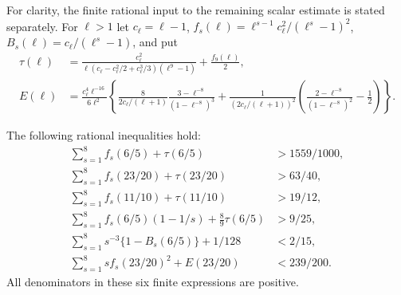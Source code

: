 For clarity, the finite rational input to the remaining scalar estimate
is stated separately.  For $\ell>1$ let $c_\ell=\ell-1$,
$f_s(\ell)=\ell^{s-1}c_\ell^2/(\ell^s-1)^2$,
$B_s(\ell)=c_\ell/(\ell^s-1)$, and put
\begin{align*}
 \tau(\ell)&=\frac{c_\ell^2}
 {\ell(c_\ell-c_\ell^2/2+c_\ell^3/3)(\ell^9-1)}
                         +\frac{f_9(\ell)}2,\\
 E(\ell)&=\frac{c_\ell^4\ell^{-16}}{6\ell^2}
 \left\{\frac{8}{2c_\ell/(\ell+1)}
                     \frac{3-\ell^{-8}}{(1-\ell^{-8})^3}
 +\frac1{(2c_\ell/(\ell+1))^2}
       \left(\frac{2-\ell^{-8}}{(1-\ell^{-8})^2}-\frac12\right)\right\}.
\end{align*}
\begin{lemma}\label{lem:low-Q0-arithmetic}
The following rational inequalities hold:
\begin{align*}
 \sum_{s=1}^8 f_s(6/5)+\tau(6/5)&>1559/1000,\\
 \sum_{s=1}^8 f_s(23/20)+\tau(23/20)&>63/40,\\
 \sum_{s=1}^8 f_s(11/10)+\tau(11/10)&>19/12,\\
 \sum_{s=1}^8 f_s(6/5)(1-1/s)+\tfrac89\tau(6/5)&>9/25,\\
 \sum_{s=1}^8s^{-3}\{1-B_s(6/5)\}+1/128&<2/15,\\
 \sum_{s=1}^8s f_s(23/20)^2+E(23/20)&<239/200.
\end{align*}
All denominators in these six finite expressions are positive.
\end{lemma}

